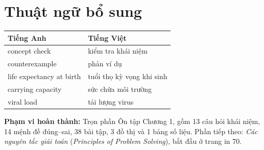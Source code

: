 \documentclass[12pt,a4paper]{article}
\begin{document}
\section*{Thuật ngữ bổ sung}\begin{center}\begin{tabular}{ll}\toprule Tiếng Anh&Tiếng Việt\\\midrule
concept check&kiểm tra khái niệm\\
counterexample&phản ví dụ\\
life expectancy at birth&tuổi thọ kỳ vọng khi sinh\\
carrying capacity&sức chứa môi trường\\
viral load&tải lượng virus\\
\bottomrule\end{tabular}\end{center}
\noindent\textbf{Phạm vi hoàn thành:} Trọn phần Ôn tập Chương 1, gồm 13 câu hỏi khái niệm, 14 mệnh đề đúng–sai, 38 bài tập, 3 đồ thị và 1 bảng số liệu. Phần tiếp theo: \textit{Các nguyên tắc giải toán} (\textit{Principles of Problem Solving}), bắt đầu ở trang in 70.
\end{document}
